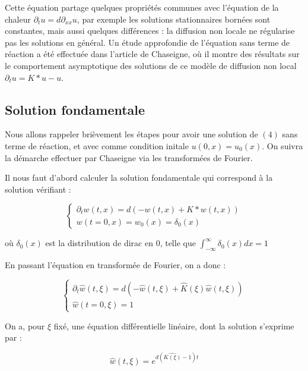 \documentclass{article}
\begin{document}
Cette équation partage quelques propriétés communes avec l'équation de la chaleur $\partial_t u = d\partial_{xx}u$, par exemple les solutions stationnaires bornées sont constantes, mais aussi quelques différences : la diffusion non locale ne régularise pas les solutions en général. Un étude approfondie de l'équation sans terme de réaction a été effectuée dans l'article de Chaseigne, où il montre des résultats sur le comportement asymptotique des solutions de ce modèle de diffusion non local $\partial_t u = K*u - u$.


\subsection{Solution fondamentale}
\indent Nous allons rappeler brièvement les étapes pour avoir une solution de $(4)$ sans terme de réaction, et avec comme condition initale $u(0,x)=u_0(x)$. On suivra la démarche effectuer par Chaseigne via les transformées de Fourier. \newline

\noindent Il nous faut d'abord calculer la solution fondamentale qui correspond à la solution vérifiant :

\begin{equation*}
\left\{
  \begin{array}{cc}
\partial_t w(t,x) =  d(-w(t,x) + K*w(t,x)) \\
w(t=0,x) = w_0(x) = \delta_0(x)
\end{array}
\right.
\end{equation*}

\noindent où $\delta_0(x)$ est la distribution de dirac en 0, telle que $\int_{-\infty}^{\infty} \delta_0(x)dx = 1$

En passant l'équation en transformée de Fourier, on a donc :

\begin{equation*}
\left\{
  \begin{array}{cc}
\partial_t \widehat{w}(t,\xi) = d(-\widehat{w}(t,\xi) + \widehat{K}(\xi) \widehat{w}(t,\xi))\\
\widehat{w}(t=0,\xi) = 1
\end{array}
\right.
\end{equation*}

On a, pour $\xi$ fixé, une équation différentielle linéaire, dont la solution s'exprime par :

\begin{equation*}
\widehat{w}(t,\xi) = e^{d(\widehat{K(\xi)} -1)t}
\end{equation*}
\end{document}
